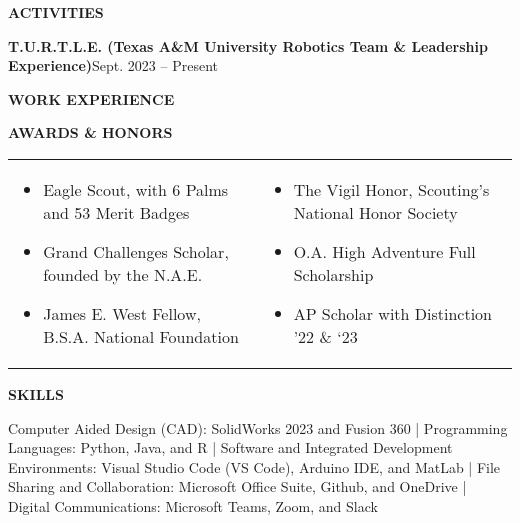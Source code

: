 \documentclass[18pt]{article}
\begin{document}
\begin{center}
    \textbf{ACTIVITIES}
    \hrulefill
\end{center}

\textbf{T.U.R.T.L.E. (Texas A\&M University Robotics Team \& Leadership Experience)}\hfill Sept. 2023 – Present
\begin{center}
    \textbf{WORK EXPERIENCE}
    \hrulefill
\end{center}

\begin{center}
    \textbf{AWARDS \& HONORS}
    \hrulefill
\end{center}
\vspace{-0.5\baselineskip}


\begin{tabular}{p{}p{}}

\begin{itemize}[noitemsep]
  \vspace{-\baselineskip}
  \item Eagle Scout, with 6 Palms and 53 Merit Badges
  \item Grand Challenges Scholar, founded by the N.A.E. 
  \item James E. West Fellow, B.S.A. National Foundation
  \vspace{-\baselineskip}
  \end{itemize}
  &
\begin{itemize}[noitemsep]
  \vspace{-\baselineskip}
  \item The Vigil Honor, Scouting’s National Honor Society 
  \item O.A. High Adventure Full Scholarship
  \item AP Scholar with Distinction ’22 \& ‘23 
  \vspace{-\baselineskip}
  
\end{itemize}\\

\end{tabular}



\begin{center}
    \textbf{SKILLS}
    \hrulefill
\end{center}
\vspace{-1.5\baselineskip}


\justify Computer Aided Design (CAD): SolidWorks 2023 and Fusion 360 | Programming Languages: Python, Java, and R | Software and Integrated Development Environments: Visual Studio Code (VS Code), Arduino IDE, and MatLab | File Sharing and Collaboration: Microsoft Office Suite, Github, and OneDrive | Digital Communications: Microsoft Teams, Zoom, and Slack
\end{document}
